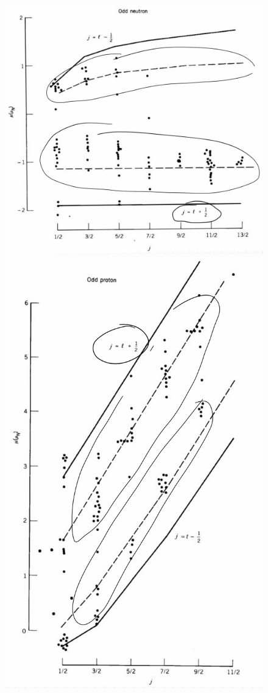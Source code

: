 \begin{figure}[!h]
    \centering
    \includegraphics[scale=0.175]{Immagini/curve-Smith.png}
    \includegraphics[scale=0.175]{Immagini/curve-Smith2.png}

\end{figure}
